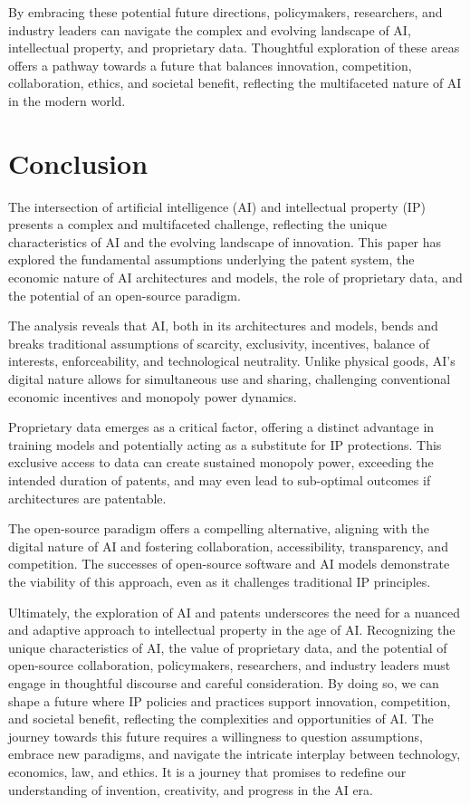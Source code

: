 \documentclass{article}[10pt]
\begin{document}
By embracing these potential future directions, policymakers, researchers, and industry leaders can navigate the complex and evolving landscape of AI, intellectual property, and proprietary data. Thoughtful exploration of these areas offers a pathway towards a future that balances innovation, competition, collaboration, ethics, and societal benefit, reflecting the multifaceted nature of AI in the modern world.

\section{Conclusion}

The intersection of artificial intelligence (AI) and intellectual property (IP) presents a complex and multifaceted challenge, reflecting the unique characteristics of AI and the evolving landscape of innovation. This paper has explored the fundamental assumptions underlying the patent system, the economic nature of AI architectures and models, the role of proprietary data, and the potential of an open-source paradigm.

The analysis reveals that AI, both in its architectures and models, bends and breaks traditional assumptions of scarcity, exclusivity, incentives, balance of interests, enforceability, and technological neutrality. Unlike physical goods, AI's digital nature allows for simultaneous use and sharing, challenging conventional economic incentives and monopoly power dynamics.

Proprietary data emerges as a critical factor, offering a distinct advantage in training models and potentially acting as a substitute for IP protections. This exclusive access to data can create sustained monopoly power, exceeding the intended duration of patents, and may even lead to sub-optimal outcomes if architectures are patentable.

The open-source paradigm offers a compelling alternative, aligning with the digital nature of AI and fostering collaboration, accessibility, transparency, and competition. The successes of open-source software and AI models demonstrate the viability of this approach, even as it challenges traditional IP principles.

Ultimately, the exploration of AI and patents underscores the need for a nuanced and adaptive approach to intellectual property in the age of AI. Recognizing the unique characteristics of AI, the value of proprietary data, and the potential of open-source collaboration, policymakers, researchers, and industry leaders must engage in thoughtful discourse and careful consideration. By doing so, we can shape a future where IP policies and practices support innovation, competition, and societal benefit, reflecting the complexities and opportunities of AI. The journey towards this future requires a willingness to question assumptions, embrace new paradigms, and navigate the intricate interplay between technology, economics, law, and ethics. It is a journey that promises to redefine our understanding of invention, creativity, and progress in the AI era.

\newpage
% 
\printbibliography
\end{document}
